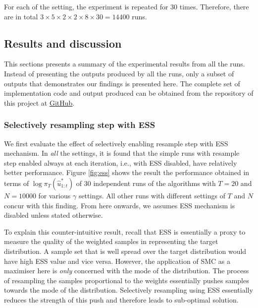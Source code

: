 For each of the setting, the experiment is repeated for $30$ times. Therefore, there are in total $3 \times 5 \times 2 \times 2 \times 8 \times 30 = 14400$ runs. 

\subsection{Results and discussion}
This sections presents a summary of the experimental results from all the runs. Instead of presenting the outputs produced by all the runs, only a subset of outputs that demonstrates our findings is presented here. The complete set of implementation code and output produced can be obtained from the repository of this project at \href{https://github.com/yowtzu/mscproj}{GitHub}.

\subsubsection{Selectively resampling step with ESS}
We first evaluate the effect of selectively enabling resample step with ESS mechanism. In \emph{all} the settings, it is found that the simple runs with resample step enabled always at each iteration, i.e., with ESS disabled,  have relatively better performance. Figure \ref{fig:ess} shows the result the performance obtained in terms of $\log\pi_T(\hat{u}^*_{1:t})$ of 30 independent runs of the algorithms with $T=20$ and $N=10000$ for various $\gamma$ settings. All other runs with different settings of $T$ and $N$ concur with this finding. From here onwards, we assumes ESS mechanism is disabled unless stated otherwise.

To explain this counter-intuitive result, recall that ESS is essentially a proxy to measure the quality of the weighted samples in representing the target distribution. A sample set that is well spread over the target distribution would have high ESS value and vice versa. However, the application of SMC as a maximiser here is \emph{only} concerned with the mode of the distribution. The process of resampling the samples proportional to the weights essentially pushes samples towards the mode of the distribution. Selectively resampling using ESS essentially reduces the strength of this push and therefore leads to sub-optimal solution.


